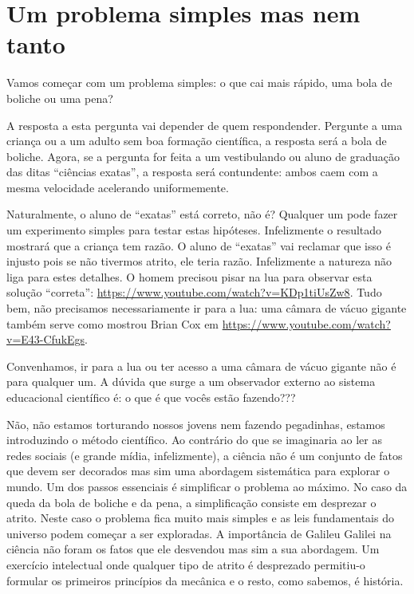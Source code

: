 \chapter{Um problema simples mas nem tanto}
\label{sec:intro}

Vamos começar com um problema simples: o que cai mais rápido, uma bola de boliche ou uma pena?

A resposta a esta pergunta vai depender de quem respondender. Pergunte a uma criança ou a um adulto sem boa formação científica, a resposta será a bola de boliche. Agora, se a pergunta for feita a um vestibulando ou aluno de graduação das ditas ``ciências exatas'', a resposta será contundente: ambos caem com a mesma velocidade acelerando uniformemente.

Naturalmente, o aluno de ``exatas'' está correto, não é? Qualquer um pode fazer um experimento simples para testar estas hipóteses. Infelizmente o resultado mostrará que a criança tem razão. O aluno de ``exatas'' vai reclamar que isso é injusto pois se não tivermos atrito, ele teria razão. Infelizmente a natureza não liga para estes detalhes. O homem precisou pisar na lua para observar esta solução ``correta'': \url{https://www.youtube.com/watch?v=KDp1tiUsZw8}. Tudo bem, não precisamos necessariamente ir para a lua: uma câmara de vácuo gigante também serve como mostrou Brian Cox em \url{https://www.youtube.com/watch?v=E43-CfukEgs}.

Convenhamos, ir para a lua ou ter acesso a uma câmara de vácuo gigante não é para qualquer um. A dúvida que surge a um observador externo ao sistema educacional científico é: o que é que vocês estão fazendo???

Não, não estamos torturando nossos jovens nem fazendo pegadinhas, estamos introduzindo o método científico. Ao contrário do que se imaginaria ao ler as redes sociais (e grande mídia, infelizmente), a ciência não é um conjunto de fatos que devem ser decorados mas sim uma abordagem sistemática para explorar o mundo. Um dos passos essenciais é simplificar o problema ao máximo. No caso da queda da bola de boliche e da pena, a simplificação consiste em desprezar o atrito. Neste caso o problema fica muito mais simples e as leis fundamentais do universo podem começar a ser exploradas. A importância de Galileu Galilei na ciência não foram os fatos que ele desvendou mas sim a sua abordagem. Um exercício intelectual onde qualquer tipo de atrito é desprezado permitiu-o formular os primeiros princípios da mecânica e o resto, como sabemos,  é história.


